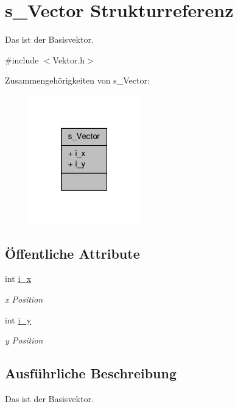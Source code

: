 \hypertarget{structs___vector}{\section{s\-\_\-\-Vector Strukturreferenz}
\label{structs___vector}
}


Das ist der Basisvektor.  




{\ttfamily \#include $<$Vektor.\-h$>$}



Zusammengehörigkeiten von s\-\_\-\-Vector\-:
\nopagebreak
\begin{figure}[H]
\begin{center}
\leavevmode
\includegraphics[width=136pt]{structs___vector__coll__graph}
\end{center}
\end{figure}
\subsection*{Öffentliche Attribute}
\begin{DoxyCompactItemize}
\item 
int \hyperlink{structs___vector_a530003f44afc98b7ce7e51f77ef8f291}{i\-\_\-x}
\begin{DoxyCompactList}\small\item\em x Position \end{DoxyCompactList}\item 
int \hyperlink{structs___vector_a13bd27672ca23d2302f5c24359f67ed2}{i\-\_\-y}
\begin{DoxyCompactList}\small\item\em y Position \end{DoxyCompactList}\end{DoxyCompactItemize}


\subsection{Ausführliche Beschreibung}
Das ist der Basisvektor. 


